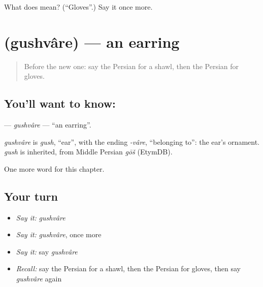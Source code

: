 \begin{tcolorbox}[breakable,colback=teal!4,colframe=teal!35!black,title={Before you move on}]
What does  mean? (\textquotedblleft{}Gloves\textquotedblright{}.) Say it once more.
\end{tcolorbox}
\section[\texorpdfstring{\fa{گوشواره} (gushvâre)}{گوشواره (gushvâre)}]{ (gushvâre) — an earring}

\label{lesson:FA-C97-gushvare}



\begin{quote}
Before the new one: say the Persian for a shawl, then the Persian for gloves.
\end{quote}

\subsection*{You'll want to know: }
\textbf{} — \emph{gushvâre} — \textquotedblleft{}an earring\textquotedblright{}.

\begin{cousinweb}
\emph{gushvâre} is \emph{gush}, \textquotedblleft{}ear\textquotedblright{}, with the ending \emph{-vâre}, \textquotedblleft{}belonging to\textquotedblright{}: the ear's ornament. \emph{gush} is inherited, from Middle Persian \emph{gōš} (EtymDB).
\end{cousinweb}

\begin{grammarlens}[title={What you've built}]
One more word for this chapter.
\end{grammarlens}

\subsection*{Your turn}
\begin{itemize}
\raggedright
  \item \emph{Say it:} \emph{gushvâre}
  \item \emph{Say it:} \emph{gushvâre}, once more
  \item \emph{Say it:} say \emph{gushvâre}
  \item \emph{Recall:} say the Persian for a shawl, then the Persian for gloves, then say \emph{gushvâre} again
\end{itemize}

